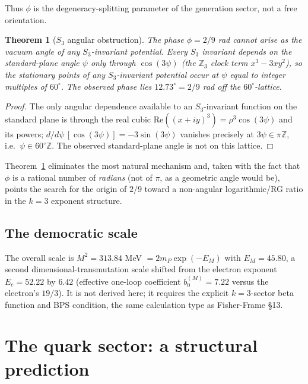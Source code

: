 \documentclass[12pt]{article}
\newtheorem{theorem}{Theorem}[section]
\theoremstyle{definition}
\theoremstyle{remark}
\begin{document}
Thus $\phi$ is the degeneracy-splitting parameter of the generation sector,
not a free orientation.

\begin{theorem}[$S_3$ angular obstruction]
\label{thm:obstruction}
The phase $\phi=2/9$ rad cannot arise as the vacuum angle of any
$S_3$-invariant potential. Every $S_3$ invariant depends on the standard-plane
angle $\psi$ only through $\cos(3\psi)$ (the $\mathbb{Z}_3$ clock term
$x^3-3xy^2$), so the stationary points of any $S_3$-invariant potential occur
at $\psi$ equal to integer multiples of $60^\circ$. The observed phase lies
$12.73^\circ=2/9$ rad off the $60^\circ$-lattice.
\end{theorem}

\begin{proof}
The only angular dependence available to an $S_3$-invariant function on the
standard plane is through the real cubic $\mathrm{Re}((x+iy)^3)=
\rho^3\cos(3\psi)$ and its powers; $d/d\psi\,[\cos(3\psi)]=-3\sin(3\psi)$
vanishes precisely at $3\psi\in\pi\mathbb{Z}$, i.e.\ $\psi\in
60^\circ\mathbb{Z}$. The observed standard-plane angle is not on this lattice.
\end{proof}

Theorem~\ref{thm:obstruction} eliminates the most natural mechanism and, taken
with the fact that $\phi$ is a rational number of \emph{radians} (not of
$\pi$, as a geometric angle would be), points the search for the origin of
$2/9$ toward a non-angular logarithmic/RG ratio in the $k=3$ exponent
structure.

\subsection{The democratic scale}

The overall scale is $M^2=313.84$ MeV $=2m_P\exp(-E_M)$ with $E_M=45.80$, a
second dimensional-transmutation scale shifted from the electron exponent
$E_e=52.22$ by $6.42$ (effective one-loop coefficient $b_0^{(M)}=7.22$ versus
the electron's $19/3$). It is not derived here; it requires the explicit
$k=3$-sector beta function and BPS condition, the same calculation type as
Fisher-Frame \S13.

\section{The quark sector: a structural prediction}
\end{document}
